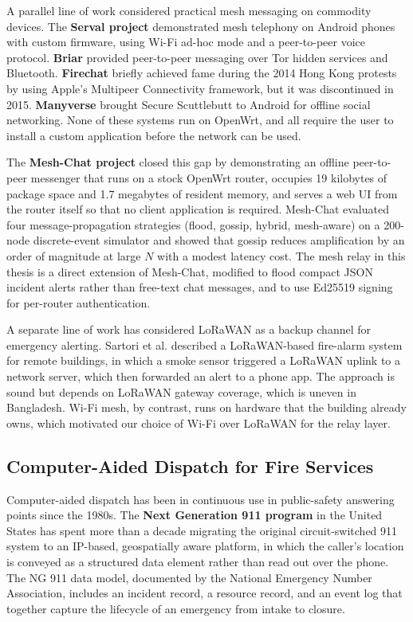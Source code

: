 A parallel line of work considered practical mesh messaging on commodity devices. The \textbf{Serval project} \cite{serval2013} demonstrated mesh telephony on Android phones with custom firmware, using Wi-Fi ad-hoc mode and a peer-to-peer voice protocol. \textbf{Briar} \cite{briar2018} provided peer-to-peer messaging over Tor hidden services and Bluetooth. \textbf{Firechat} \cite{firechat2015} briefly achieved fame during the 2014 Hong Kong protests by using Apple's Multipeer Connectivity framework, but it was discontinued in 2015. \textbf{Manyverse} \cite{manyverse2019} brought Secure Scuttlebutt to Android for offline social networking. None of these systems run on OpenWrt, and all require the user to install a custom application before the network can be used.

The \textbf{Mesh-Chat project} \cite{meshchat2026} closed this gap by demonstrating an offline peer-to-peer messenger that runs on a stock OpenWrt router, occupies 19 kilobytes of package space and 1.7 megabytes of resident memory, and serves a web UI from the router itself so that no client application is required. Mesh-Chat evaluated four message-propagation strategies (flood, gossip, hybrid, mesh-aware) on a 200-node discrete-event simulator and showed that gossip reduces amplification by an order of magnitude at large $N$ with a modest latency cost. The mesh relay in this thesis is a direct extension of Mesh-Chat, modified to flood compact JSON incident alerts rather than free-text chat messages, and to use Ed25519 signing for per-router authentication.

A separate line of work has considered LoRaWAN as a backup channel for emergency alerting. Sartori et al. \cite{sartori2024lora} described a LoRaWAN-based fire-alarm system for remote buildings, in which a smoke sensor triggered a LoRaWAN uplink to a network server, which then forwarded an alert to a phone app. The approach is sound but depends on LoRaWAN gateway coverage, which is uneven in Bangladesh. Wi-Fi mesh, by contrast, runs on hardware that the building already owns, which motivated our choice of Wi-Fi over LoRaWAN for the relay layer.

\subsection{Computer-Aided Dispatch for Fire Services}

Computer-aided dispatch has been in continuous use in public-safety answering points since the 1980s. The \textbf{Next Generation 911 program} in the United States \cite{ng9112023} has spent more than a decade migrating the original circuit-switched 911 system to an IP-based, geospatially aware platform, in which the caller's location is conveyed as a structured data element rather than read out over the phone. The NG 911 data model, documented by the National Emergency Number Association, includes an incident record, a resource record, and an event log that together capture the lifecycle of an emergency from intake to closure.

